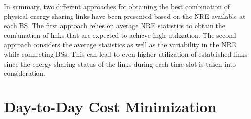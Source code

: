 \documentclass[10pt, letter,twocolumn]{IEEEtran}
\begin{document}


In summary, two different approaches for obtaining the best combination of physical energy sharing links have been presented based on the NRE available at each BS. The first approach relies on average NRE statistics to obtain the combination of links that are expected to achieve high utilization. The second approach considers the average statistics as well as the variability in the NRE while connecting BSs. This can lead to even higher utilization of established links since the energy sharing status of the links during each time slot is taken into consideration.

\vspace{-0.0cm}
\section{Day-to-Day Cost Minimization} \label{sec_day_to_day}
\end{document}
